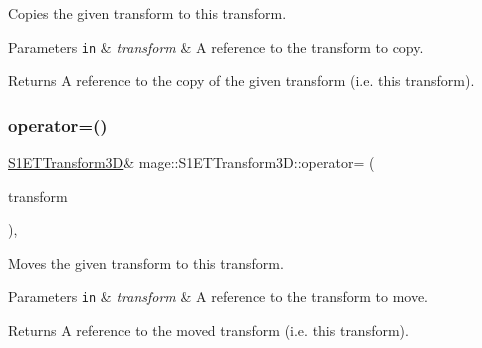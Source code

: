 Copies the given transform to this transform.


\begin{DoxyParams}[1]{Parameters}
\mbox{\tt in}  & {\em transform} & A reference to the transform to copy. \\
\hline
\end{DoxyParams}
\begin{DoxyReturn}{Returns}
A reference to the copy of the given transform (i.\+e. this transform). 
\end{DoxyReturn}
\mbox{\label{classmage_1_1_s1_e_t_transform3_d_a9ce87c509ed1a659037f6a4201946c90}} 
\subsubsection{\texorpdfstring{operator=()}{operator=()}\hspace{0.1cm}{\footnotesize\ttfamily [2/2]}}
{\footnotesize\ttfamily \mbox{\hyperlink{classmage_1_1_s1_e_t_transform3_d}{S1\+E\+T\+Transform3D}}\& mage\+::\+S1\+E\+T\+Transform3\+D\+::operator= (\begin{DoxyParamCaption}\item[{\mbox{\hyperlink{classmage_1_1_s1_e_t_transform3_d}{S1\+E\+T\+Transform3D}} \&\&}]{transform }\end{DoxyParamCaption})\hspace{0.3cm}{\ttfamily [default]}, {\ttfamily [noexcept]}}

Moves the given transform to this transform.


\begin{DoxyParams}[1]{Parameters}
\mbox{\tt in}  & {\em transform} & A reference to the transform to move. \\
\hline
\end{DoxyParams}
\begin{DoxyReturn}{Returns}
A reference to the moved transform (i.\+e. this transform). 
\end{DoxyReturn}
\mbox{\label{classmage_1_1_s1_e_t_transform3_d_af17a893cd25b7a0d5b478d542d2723b9}} 
